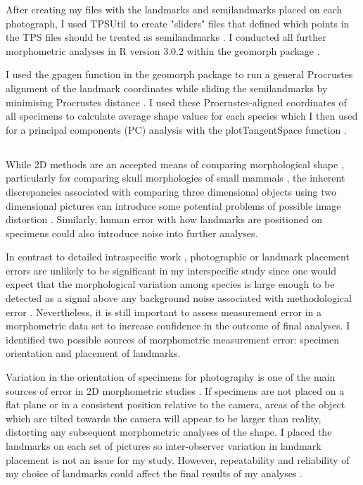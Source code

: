 	After creating my files with the landmarks and semilandmarks placed on each photograph, I used TPSUtil \citep{Rohlf2012} to create "sliders" files that defined which points in the TPS files should be treated as semilandmarks \citep{Zelditch2012}. I conducted all further morphometric analyses in R version 3.0.2 \citep{Team2014} within the geomorph package \citep{Adams2013}.

	
	I used the gpagen function in the geomorph package \citep{Adams2013} to run a general Procrustes alignment \citep{Rohlf1993} of the landmark coordinates while sliding the semilandmarks by minimising Procrustes distance \citep{Bookstein1997}.
	I used these Procrustes-aligned coordinates of all specimens to calculate average shape values for each species which I then used for a principal components (PC) analysis with the plotTangentSpace function \citep{Adams2013}. 
	

\subsection{}
	 
	While 2D methods are an accepted means of comparing morphological shape \citep[e.g.][]{Adams2004, Mitteroecker2009}, particularly for comparing skull morphologies of small mammals \citep[e.g.][]{Cardini2003, Panchetti2008, White2008, Barrow2008, Scalici2011}, the inherent discrepancies associated with comparing three dimensional objects using two dimensional pictures can introduce some potential problems of possible image distortion \citep{Arnqvist1998}. Similarly, human error with how landmarks are positioned on specimens could also introduce noise into further analyses. 
	
	In contrast to detailed intraspecific work \citep[e.g.][]{Bornholdt2008, Blagojevic2011}, photographic or landmark placement errors are unlikely to be significant in my interspecific study since one would expect that the morphological variation among species is large enough to  be detected as a signal above any background noise associated with methodological error \citep{Arnqvist1998}. Nevertheless, it is still important to assess measurement error in a morphometric data set to increase confidence in the outcome of final analyses.
	I identified two possible sources of morphometric measurement error: specimen orientation and placement of landmarks.

	Variation in the orientation of specimens for photography is one of the main sources of error in 2D morphometric studies \citep{Adriaens2007}. If specimens are not placed on a flat plane or in a consistent position relative to the camera, areas of the object which are tilted towards the camera will appear to be larger than reality, distorting any subsequent morphometric analyses of the shape. 
	I placed the landmarks on each set of pictures so inter-observer variation in landmark placement is not an issue for my study.  However, repeatability and reliability of my choice of landmarks could affect the final results of my analyses \citep{Arnqvist1998}.


